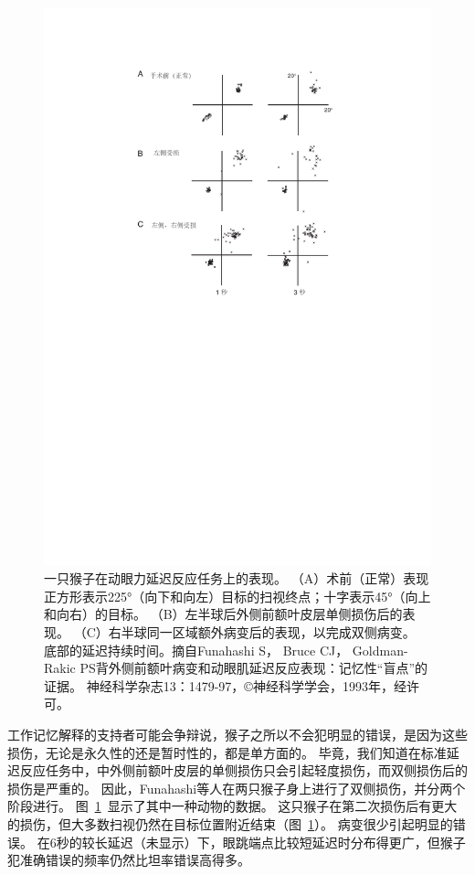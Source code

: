 \begin{figure}
	\centering
	\includegraphics[width=0.7\linewidth]{image_pfc/Fig_5_7}
	\caption{一只猴子在动眼力延迟反应任务上的表现。
		（A）术前（正常）表现正方形表示225°（向下和向左）目标的扫视终点；十字表示45°（向上和向右）的目标。
		（B）左半球后外侧前额叶皮层单侧损伤后的表现。
		（C）右半球同一区域额外病变后的表现，以完成双侧病变。
		底部的延迟持续时间。摘自Funahashi S， Bruce CJ， Goldman-Rakic PS背外侧前额叶病变和动眼肌延迟反应表现：记忆性“盲点”的证据。
		神经科学杂志13：1479-97，©神经科学学会，1993年，经许可。}
	\label{fig:fig_5_7}
\end{figure}


工作记忆解释的支持者可能会争辩说，猴子之所以不会犯明显的错误，是因为这些损伤，无论是永久性的还是暂时性的，都是单方面的。
毕竟，我们知道在标准延迟反应任务中，中外侧前额叶皮层的单侧损伤只会引起轻度损伤\cite{rosen1975effects}，而双侧损伤后的损伤是严重的\cite{goldman1971analysis}。
因此，Funahashi等人\cite{funahashi1993dorsolateral}在两只猴子身上进行了双侧损伤，并分两个阶段进行。
图~\ref{fig:fig_5_7}~显示了其中一种动物的数据。
这只猴子在第二次损伤后有更大的损伤，但大多数扫视仍然在目标位置附近结束（图~\ref{fig:fig_5_7}）。
病变很少引起明显的错误。
在6秒的较长延迟（未显示）下，眼跳端点比较短延迟时分布得更广，但猴子犯准确错误的频率仍然比坦率错误高得多。


